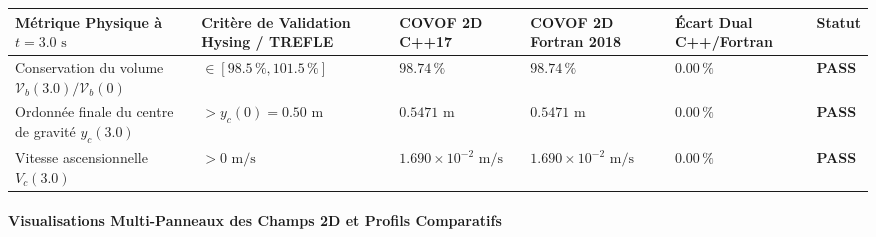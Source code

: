 \documentclass[
  10pt,
]{article}
\newcounter{none} %
\begin{document}
{\def\LTcaptype{none} %
\begin{longtable}[]{@{}
  >{\raggedright\arraybackslash}p{}
  >{\centering\arraybackslash}p{}
  >{\centering\arraybackslash}p{}
  >{\centering\arraybackslash}p{}
  >{\centering\arraybackslash}p{}
  >{\centering\arraybackslash}p{}@{}}
\toprule\noalign{}
\begin{minipage}[b]{\linewidth}\raggedright
Métrique Physique à \(t = 3.0\text{ s}\)
\end{minipage} & \begin{minipage}[b]{\linewidth}\centering
Critère de Validation Hysing / TREFLE
\end{minipage} & \begin{minipage}[b]{\linewidth}\centering
COVOF 2D C++17
\end{minipage} & \begin{minipage}[b]{\linewidth}\centering
COVOF 2D Fortran 2018
\end{minipage} & \begin{minipage}[b]{\linewidth}\centering
Écart Dual C++/Fortran
\end{minipage} & \begin{minipage}[b]{\linewidth}\centering
Statut
\end{minipage} \\
\midrule\noalign{}
\endhead
\bottomrule\noalign{}
\endlastfoot
Conservation du volume \(\mathcal{V}_b(3.0) / \mathcal{V}_b(0)\) &
\(\in [98.5\,\%, 101.5\,\%]\) & \textbf{\(98.74\,\%\)} &
\textbf{\(98.74\,\%\)} & \textbf{\(0.00\,\%\)} & \textbf{PASS} \\
Ordonnée finale du centre de gravité \(y_c(3.0)\) &
\(> y_c(0) = 0.50\text{ m}\) & \textbf{\(0.5471\text{ m}\)} &
\textbf{\(0.5471\text{ m}\)} & \textbf{\(0.00\,\%\)} & \textbf{PASS} \\
Vitesse ascensionnelle \(V_c(3.0)\) & \(> 0\text{ m/s}\) &
\textbf{\(1.690 \times 10^{-2}\text{ m/s}\)} &
\textbf{\(1.690 \times 10^{-2}\text{ m/s}\)} & \textbf{\(0.00\,\%\)} &
\textbf{PASS} \\
\end{longtable}
}

\paragraph{Visualisations Multi-Panneaux des Champs 2D et Profils
Comparatifs}\label{visualisations-multi-panneaux-des-champs-2d-et-profils-comparatifs-12}
\end{document}
